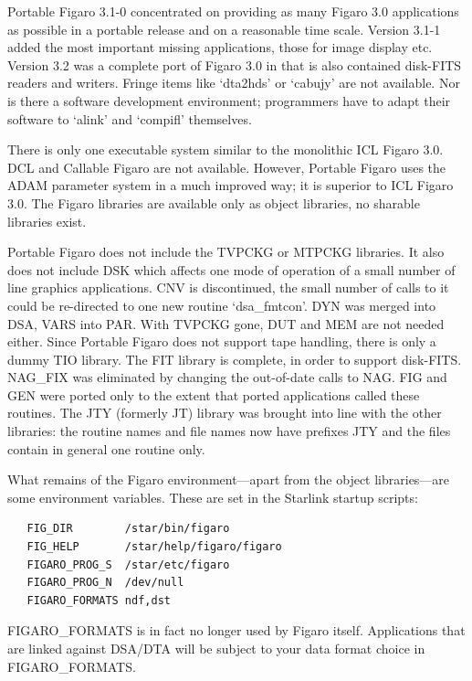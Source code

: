 \documentclass[11pt,twoside]{article}
\newcommand{\latorhtm}[2]{#1}
\newcommand{\latorhtm}[2]{#2}
\begin{document}
   Portable Figaro 3.1-0 concentrated on providing as many Figaro 3.0
   applications as possible in a portable release and on a reasonable
   time scale.  Version 3.1-1 added the most important missing
   applications, those for image display etc.  Version 3.2 was a complete
   port of Figaro 3.0 in that is also contained disk-FITS readers and
   writers.  Fringe items like `dta2hds' or `cabujy' are not available.
   Nor is there a software development environment; programmers have to
   adapt their software to `alink' and `compifl' themselves.

   There is only one executable system similar to the monolithic ICL
   Figaro 3.0. DCL and Callable Figaro are not available.  However,
   Portable Figaro uses the ADAM parameter system in a much improved
   way; it is superior to ICL Figaro 3.0. The Figaro libraries are
   available only as object libraries, no sharable libraries exist.

   Portable Figaro does not include the TVPCKG or MTPCKG libraries.  It also
   does not include DSK which affects one mode of operation of a small
   number of line graphics applications. CNV is discontinued, the small
   number of calls to it could be re-directed to one new routine
   `dsa\_fmtcon'. DYN was merged into DSA, VARS into PAR. With TVPCKG gone,
   DUT and MEM are not needed either.  Since Portable Figaro does not
   support tape handling, there is only a dummy TIO library. The FIT
   library is complete, in order to support disk-FITS.  NAG\_FIX was
   eliminated by changing the out-of-date calls to NAG. FIG and GEN were
   ported only to the extent that ported applications called these
   routines. The JTY (formerly JT) library was brought into line with
   the other libraries: the routine names and file names now have
   prefixes JTY and the files contain in general one routine only.

   What remains of the Figaro environment\latorhtm{---}{-}apart from the
   object libraries\latorhtm{---}{-}are some environment variables. These
   are set in the Starlink startup scripts:

\begin{verbatim}
   FIG_DIR        /star/bin/figaro
   FIG_HELP       /star/help/figaro/figaro
   FIGARO_PROG_S  /star/etc/figaro
   FIGARO_PROG_N  /dev/null
   FIGARO_FORMATS ndf,dst
\end{verbatim}

   FIGARO\_FORMATS is in fact no longer used by Figaro itself.
   Applications that are linked against DSA/DTA will be subject to
   your data format choice in FIGARO\_FORMATS.
\end{document}
